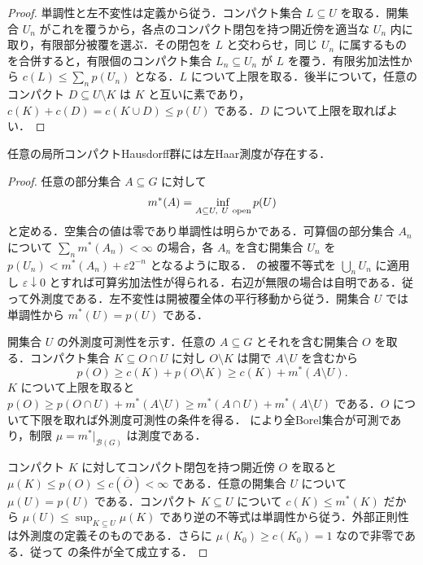 \begin{proof}
単調性と左不変性は定義から従う．コンパクト集合 $L\subseteq U$ を取る．開集合 $U_n$ がこれを覆うから，各点のコンパクト閉包を持つ開近傍を適当な $U_n$ 内に取り，有限部分被覆を選ぶ．その閉包を $L$ と交わらせ，同じ $U_n$ に属するものを合併すると，有限個のコンパクト集合 $L_n\subseteq U_n$ が $L$ を覆う．有限劣加法性から $c(L)\leq\sum_n p(U_n)$ となる．$L$ について上限を取る．後半について，任意のコンパクト $D\subseteq U\setminus K$ は $K$ と互いに素であり，$c(K)+c(D)=c(K\cup D)\leq p(U)$ である．$D$ について上限を取ればよい．
\end{proof}
\begin{prop}[Haar測度の存在]
任意の局所コンパクトHausdorff群には左Haar測度が存在する．
\end{prop}
\begin{proof}
任意の部分集合 $A\subseteq G$ に対して
\[
m^*(A)=\inf_{A\subseteq U,\ U\ {\rm open}}p(U)
\]
と定める．空集合の値は零であり単調性は明らかである．可算個の部分集合 $A_n$ について $\sum_nm^*(A_n)<\infty$ の場合，各 $A_n$ を含む開集合 $U_n$ を $p(U_n)<m^*(A_n)+\varepsilon2^{-n}$ となるように取る． の被覆不等式を $\bigcup_nU_n$ に適用し $\varepsilon\downarrow0$ とすれば可算劣加法性が得られる．右辺が無限の場合は自明である．従って外測度である．左不変性は開被覆全体の平行移動から従う．開集合 $U$ では単調性から $m^*(U)=p(U)$ である．

開集合 $U$ の外測度可測性を示す．任意の $A\subseteq G$ とそれを含む開集合 $O$ を取る．コンパクト集合 $K\subseteq O\cap U$ に対し $O\setminus K$ は開で $A\setminus U$ を含むから
\[
p(O)\geq c(K)+p(O\setminus K)\geq c(K)+m^*(A\setminus U).
\]
$K$ について上限を取ると $p(O)\geq p(O\cap U)+m^*(A\setminus U)\geq m^*(A\cap U)+m^*(A\setminus U)$ である．$O$ について下限を取れば外測度可測性の条件を得る． により全Borel集合が可測であり，制限 $\mu=m^*|_{\mathcal B(G)}$ は測度である．

コンパクト $K$ に対してコンパクト閉包を持つ開近傍 $O$ を取ると $\mu(K)\leq p(O)\leq c(\overline O)<\infty$ である．任意の開集合 $U$ について $\mu(U)=p(U)$ である．コンパクト $K\subseteq U$ について $c(K)\leq m^*(K)$ だから $\mu(U)\leq\sup_{K\subseteq U}\mu(K)$ であり逆の不等式は単調性から従う．外部正則性は外測度の定義そのものである．さらに $\mu(K_0)\geq c(K_0)=1$ なので非零である．従って  の条件が全て成立する．
\end{proof}
